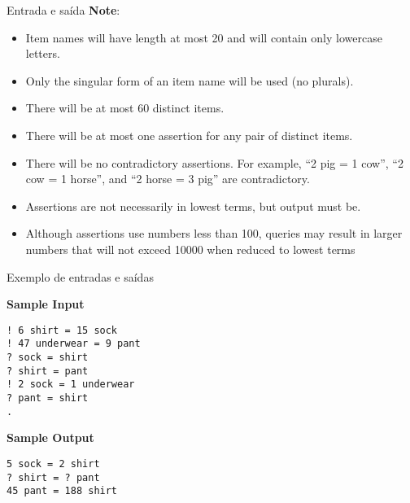 \begin{frame}[fragile]{Entrada e saída}
\textbf{Note}:

\begin{itemize}
    \item Item names will have length at most 20 and will contain only lowercase letters.
    \item Only the singular form of an item name will be used (no plurals).
    \item There will be at most 60 distinct items.
    \item There will be at most one assertion for any pair of distinct items.
    \item There will be no contradictory assertions. For example, “2 pig = 1 cow”, “2 cow = 1 horse”, and “2 horse = 3 pig” are contradictory.
    \item Assertions are not necessarily in lowest terms, but output must be.
    \item Although assertions use numbers less than 100, queries may result in larger numbers that will not exceed 10000 when reduced to lowest terms
\end{itemize}

\end{frame}


\begin{frame}[fragile]{Exemplo de entradas e saídas}

\begin{minipage}[t]{0.6\textwidth}
\textbf{Sample Input}
\begin{verbatim}
! 6 shirt = 15 sock
! 47 underwear = 9 pant
? sock = shirt
? shirt = pant
! 2 sock = 1 underwear
? pant = shirt
.
\end{verbatim}
\end{minipage}
\begin{minipage}[t]{0.35\textwidth}
\textbf{Sample Output}
\begin{verbatim}
5 sock = 2 shirt
? shirt = ? pant
45 pant = 188 shirt
\end{verbatim}
\end{minipage}
\end{frame}


